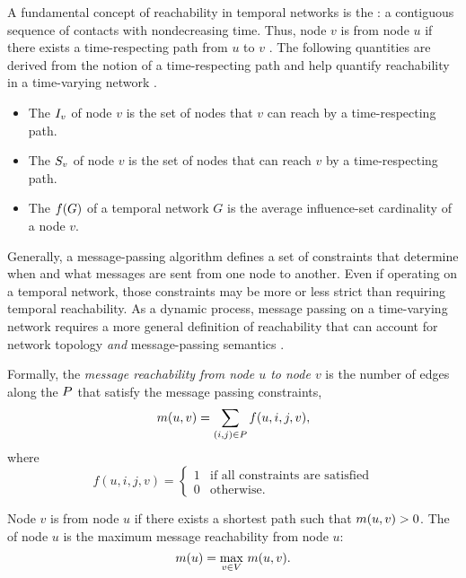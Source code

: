 A fundamental concept of reachability in temporal networks is the : a contiguous sequence of contacts with nondecreasing time. Thus, node $v$ is  from node $u$ if there exists a time-respecting path from $u$ to $v$ \citep{Moody2002}. The following quantities are derived from the notion of a time-respecting path and help quantify reachability in a time-varying network \citep{Holme2012}.
\begin{itemize}
  \item The  $I_v$ of node $v$ is the set of nodes that $v$ can reach by a time-respecting path.
  \item The  $S_v$ of node $v$ is the set of nodes that can reach $v$ by a time-respecting path.
  \item The  $f(G)$ of a temporal network $G$ is the average influence-set cardinality of a node $v$.
\end{itemize}

Generally, a message-passing algorithm defines a set of constraints that determine when and what messages are sent from one node to another. Even if operating on a temporal network, those constraints may be more or less strict than requiring temporal reachability. As a dynamic process, message passing on a time-varying network requires a more general definition of reachability that can account for network topology \emph{and} message-passing semantics \citep{Barrat2013}.

Formally, the \emph{message reachability from node $u$ to node $v$} is the number of edges along the  $P$ that satisfy the message passing constraints,
\begin{equation*}
  m(u, v) = \sum_{(i, j) \in P} f(u, i, j, v),
\end{equation*}
where
\begin{equation*}
  f(u, i, j, v) = 
    \begin{cases}
      1 & \text{if all constraints are satisfied} \\ 
      0 & \text{otherwise.}
    \end{cases}
\end{equation*}

Node $v$ is  from node $u$ if there exists a shortest path such that $m(u, v) > 0$. The  of node $u$ is the maximum message reachability from node $u$:
\begin{equation}\label{eq:vreach}
  m(u) = \max_{v \in V} \, m(u, v).
\end{equation}

